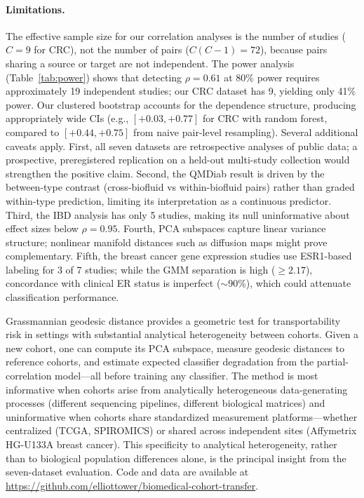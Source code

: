 \documentclass[11pt]{article}
\begin{document}
\paragraph{Limitations.} The effective sample size for our correlation analyses is the number of studies ($C = 9$ for CRC), not the number of pairs ($C(C-1) = 72$), because pairs sharing a source or target are not independent. The power analysis (Table~\ref{tab:power}) shows that detecting $\rho = 0.61$ at 80\% power requires approximately 19 independent studies; our CRC dataset has 9, yielding only 41\% power. Our clustered bootstrap accounts for the dependence structure, producing appropriately wide CIs (e.g., $[+0.03, +0.77]$ for CRC with random forest, compared to $[+0.44, +0.75]$ from naive pair-level resampling). Several additional caveats apply. First, all seven datasets are retrospective analyses of public data; a prospective, preregistered replication on a held-out multi-study collection would strengthen the positive claim. Second, the QMDiab result is driven by the between-type contrast (cross-biofluid vs within-biofluid pairs) rather than graded within-type prediction, limiting its interpretation as a continuous predictor. Third, the IBD analysis has only 5 studies, making its null uninformative about effect sizes below $\rho = 0.95$. Fourth, PCA subspaces capture linear variance structure; nonlinear manifold distances such as diffusion maps \citep{conway1996functions} might prove complementary. Fifth, the breast cancer gene expression studies use ESR1-based labeling for 3 of 7 studies; while the GMM separation is high ($\geq 2.17$), concordance with clinical ER status is imperfect ($\sim$90\%), which could attenuate classification performance.

Grassmannian geodesic distance provides a geometric test for transportability risk in settings with substantial analytical heterogeneity between cohorts. Given a new cohort, one can compute its PCA subspace, measure geodesic distances to reference cohorts, and estimate expected classifier degradation from the partial-correlation model---all before training any classifier. The method is most informative when cohorts arise from analytically heterogeneous data-generating processes (different sequencing pipelines, different biological matrices) and uninformative when cohorts share standardized measurement platforms---whether centralized (TCGA, SPIROMICS) or shared across independent sites (Affymetrix HG-U133A breast cancer). This specificity to analytical heterogeneity, rather than to biological population differences alone, is the principal insight from the seven-dataset evaluation. Code and data are available at \url{https://github.com/elliottower/biomedical-cohort-transfer}.
\end{document}
